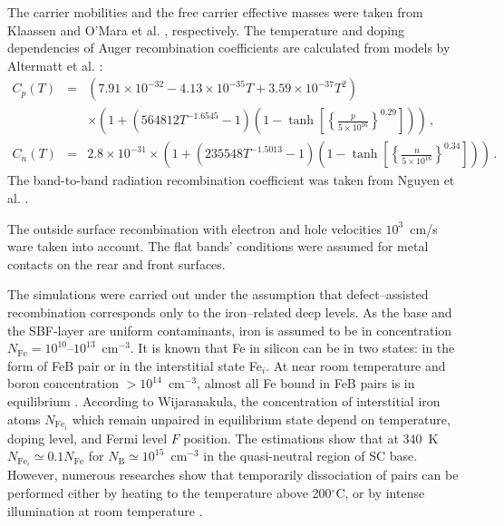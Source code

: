 \documentclass[num-refs]{wiley-article} %
\begin{document}
The carrier mobilities and the free carrier effective masses  were taken from Klaassen \cite{KLAASSEN953}
and O'Mara et al. \cite{OMara}, respectively.
The temperature and doping dependencies of Auger recombination coefficients are calculated from models by Altermatt et al. \cite{Si_Auger}:
\begin{eqnarray}
   \nonumber C_{p} (T)&=& (7.91\times10^{-32}-4.13\times10^{-35}T+3.59\times10^{-37}T^2)\\
  &&\times\left(1+\left(564812T^{-1.6545}-1\right)\left(1-\tanh\left[\left\{\frac{p}{5\times10^{16}}\right\}^{0.29}\right]\right)\right)\,, \\
   C_{n} (T)&=& 2.8\times10^{-31}
  \times\left(1+\left(235548T^{-1.5013}-1\right)\left(1-\tanh\left[\left\{\frac{n}{5\times10^{16}}\right\}^{0.34}\right]\right)\right)\,.
\end{eqnarray}
The band-to-band radiation recombination coefficient was taken from Nguyen et al. \cite{Si_BtB}.

The outside surface recombination with electron and hole velocities $10^3$~cm/s ware taken into account.
The flat bands' conditions were assumed for metal contacts on the rear and
front surfaces.


The simulations were carried out under the assumption that defect–assisted recombination corresponds only to the iron–related deep levels.
As the base and the SBF-layer are uniform contaminants, iron is assumed to be in concentration
$N_{\mathrm{Fe}}=10^{10}$--$10^{13}$~cm$^{-3}$.
It is known that Fe in silicon can be in two states:
in the form of FeB pair or in the interstitial state Fe$_i$.
At near room temperature and boron concentration $>10^{14}$~cm$^{-3}$,
almost all Fe bound in FeB pairs is in equilibrium \cite{FeB:kinetic,FeBAssJAP2014,FeBAssSST2011,FeBJAP2005}.
According to Wijaranakula\cite{FeB:kinetic},
the concentration of interstitial iron atoms $N_{\mathrm{Fe}_i}$ which
remain unpaired in equilibrium state depend on temperature, doping level,
and Fermi level $F$ position.
The estimations show that at 340~K  $N_{\mathrm{Fe}_i}\simeq0.1 N_\mathrm{Fe}$
for $N_\mathrm{B}\simeq10^{15}$~cm$^{-3}$ in the quasi-neutral
region of SC base.
However, numerous researches show that temporarily dissociation of pairs can be performed either by heating to the temperature above 200$^\circ$C,
or by intense illumination at room temperature \cite{FeBAssJAP2014,FeBJAP2005}.
\end{document}

